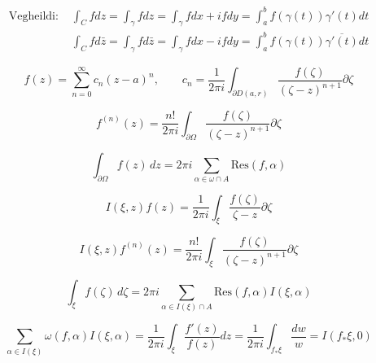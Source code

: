 \begin{minipage}{1\linewidth}
\begin{align*} \text{Vegheildi: }
&\int_C f dz = \int _{\gamma} fdz =\int_{\gamma}fdx+ ifdy = \int_{a}^{b} f(\gamma(t)) \gamma'(t)dt \\
&\int_C f d\bar{z} = \int _{\gamma} fd\bar{z} =\int_{\gamma}fdx - ifdy = \int_{a}^{b} f(\gamma(t)) \overline{\gamma'(t)}dt
\end{align*}
\end{minipage}

\bigskip

\begin{equation*}	
		f(z) = \sum_{n=0}^{\infty} c_n(z-a) ^ {n}, \qquad c_n = 
\frac{1}{2\pi i} \int_{\partial D(a,r)} \frac{f(\zeta)}{(\zeta - z) ^ {n+1}} \partial \zeta
\end{equation*}


\bigskip

\[
f ^ {(n)} (z) = \frac{n!}{2\pi i} \int_{\partial \Omega} \frac{f(\zeta)}{(\zeta - z) ^ {n+1}} \partial \zeta
\]
\bigskip

\[
		\int_{\partial \Omega} f(z)\,dz = 2 \pi i \sum_{\alpha \in \omega \cap A} \text{Res} (f, \alpha)
\]
\bigskip

\[
I(\xi, z)f(z) = \frac{1}{2\pi i} \int_{\xi} \frac{f(\zeta)}{\zeta - z} \partial \zeta
\]
\bigskip

\[
I(\xi, z)f ^ {(n)} (z) = \frac{n!}{2\pi i} \int_{\xi} \frac{f(\zeta)}{(\zeta - z) ^ {n+1}} \partial \zeta
\]
\bigskip

\[
\int_{\xi} f(\zeta)\,d\zeta = 2 \pi i \sum_{\alpha \in I(\xi)\cap A} \text{Res} (f, \alpha)I(\xi, \alpha)
\]
\bigskip

\[
\sum_{\alpha \in I(\xi)}\omega(f,\alpha)I(\xi,\alpha)=\frac{1}{2\pi i}\int_{\xi}\frac{f'(z)}{f(z)}dz=\frac{1}{2\pi i}\int_{f_*\xi}\frac{dw}{w}=I(f_*\xi, 0)
\]
